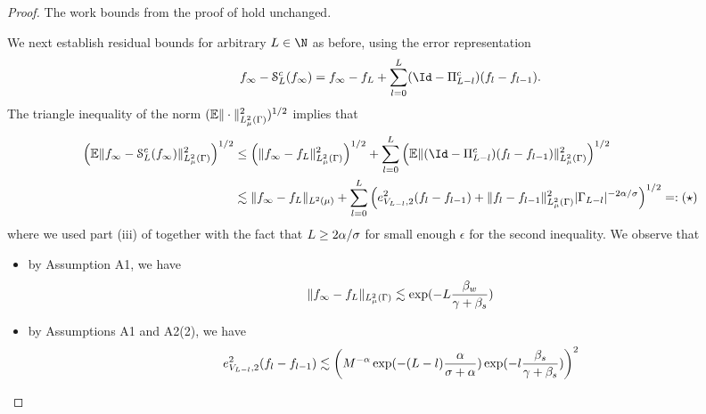 \begin{proof}
	The work bounds from the proof of  hold unchanged.
	
We next establish residual bounds for arbitrary $L\in\N$ as before, using the error representation
	\begin{equation*}
	\rs_{\infty}-\smol^{\cond}_{L}(\rs_{\infty})=\rs_{\infty}-\rs_{L}+\sum_{l=0}^{L}(\Id-\P^{\cond}_{L-l})(\rs_{l}-\rs_{l-1}).
	\end{equation*}
	The triangle inequality of the norm $(\mathbb{E}\|\cdot\|_{L^2_{\mu}(\Gamma)}^2)^{1/2}$ implies that
	\begin{equation*}
	\begin{split}
	\left(\expect\norm{\rs_{\infty}-\smol^{\cond}_{L}(\rs_{\infty})}{L^2_{\measure}(\domPS)}^2\right)^{1/2}&\leq \left(\norm{\rs_{\infty}-\rs_{L}}{L^2_{\measure}(\domPS)}^2\right)^{1/2}+\sum_{l=0}^{L}\left(\expect\norm{(\Id-\P^{\cond}_{L-l})(\rs_{l}-\rs_{l-1})}{L^2_{\measure}(\domPS)}^2\right)^{1/2}\\
		&\lesssim \norm{\rs_{\infty}-\rs_{L}}{L^2(\measure)}+\sum_{l=0}^{L}\left(e_{\vsp_{L-l},2}^2(\rs_{l}-\rs_{l-1})+\norm{\rs_{l}-\rs_{l-1}}{L^2_{\measure}(\domPS)}^2|\domPS_{L-l}|^{-2\alpha/\dimp}\right)^{1/2}=:(\star)
	\end{split}
	\end{equation*}
	where we used part (iii) of  together with the fact that $L\geq 2\alpha/\sigma$ for small enough $\epsilon$ for the second inequality. We observe that
	\begin{itemize}
		\item by Assumption {A1}, we have
		\begin{equation*}
		\|f_{\infty}-f_{L}\|_{L^2_{\mu}(\Gamma)}\lesssim  \exp(-L\frac{\beta_{w}}{\gamma+\beta_{s}})
		\end{equation*}
		\item by Assumptions {A1} and {A2(2)}, we have 
		\begin{equation*}
		\begin{split}
		e_{V_{L-l},2}^2(f_{l}-f_{l-1})\lesssim \left(M^{-\alpha}\exp(-(L-l)\frac{\alpha}{\sigma+\alpha})\exp(-l\frac{\beta_{s}}{\gamma+\beta_{s}})\right)^{2}
		\end{split}
		\end{equation*}
		

\end{itemize}
\end{proof}
